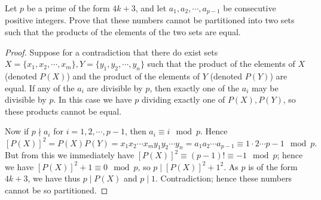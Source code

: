 %
\begin{prb}
Let $p$ be a prime of the form $4k+3$, and let $a_1, a_2, \cdots, a_{p-1}$ be consecutive positive integers.  Prove that these numbers cannot be partitioned into two sets such that the products of the elements of the two sets are equal.
\begin{proof}
Suppose for a contradiction that there do exist sets $X = \{x_1, x_2, \cdots, x_m\}, Y = \{y_1, y_2, \cdots, y_n\}$ such that the product of the elements of $X$ (denoted $P(X)$) and the product of the elements of $Y$ (denoted $P(Y)$) are equal.  If any of the $a_i$ are divisible by $p$, then exactly one of the $a_i$ may be divisible by $p$.  In this case we have $p$ dividing exactly one of $P(X), P(Y)$, so these products cannot be equal.

Now if $p \nmid a_i$ for $i = 1, 2, \cdots, p-1$, then $a_i \equiv i\mod{p}$.  Hence $$[P(X)]^2 = P(X)P(Y) = x_1x_2\cdots x_my_1 y_2 \cdots y_n = a_1a_2\cdots a_{p-1} \equiv 1\cdot2\cdots p-1\mod{p}.$$  But from this we immediately have $[P(X)]^2 \equiv (p-1)! \equiv -1\mod{p}$; hence we have $[P(X)]^2 + 1 \equiv 0\mod{p}$, so $p \mid [P(X)]^2+1^2$.  As $p$ is of the form $4k+3$, we have thus $p \mid P(X)$ and $p \mid 1$.  Contradiction; hence these numbers cannot be so partitioned.
\end{proof}
\end{prb}
